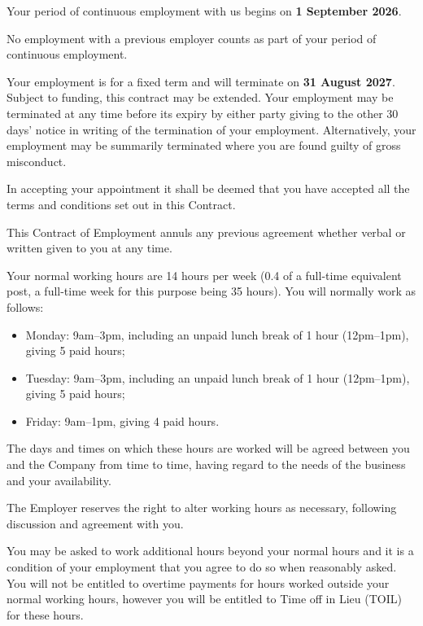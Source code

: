 \documentclass[a4paper,11pt,onecolumn ]{article}
\begin{document}
\begin{legal}
\item {}
\begin{legal}
  \item Your period of continuous employment with us begins on \textbf{1 September 2026}.
  \item No employment with a previous employer counts as part of your period of
  continuous employment.
  \item Your employment is for a fixed term and will terminate on \textbf{31 August 2027}.
  Subject to funding, this contract may be extended. Your employment may be
  terminated at any time before its expiry by either party giving to the other 30
  days’ notice in writing of the termination of your employment. Alternatively,
  your employment may be summarily terminated where you are found guilty of
  gross misconduct.
  \item In accepting your appointment it shall be deemed that you have accepted all the
  terms and conditions set out in this Contract.
  \item This Contract of Employment annuls any previous agreement whether verbal or
  written given to you at any time.
\end{legal}


\item {}
\begin{legal}
\item Your normal working hours are 14 hours per week (0.4 of a full-time equivalent post, a
full-time week for this purpose being 35 hours). You will normally work as follows:
\begin{itemize}
\item Monday: 9am--3pm, including an unpaid lunch break of 1 hour (12pm--1pm), giving 5 paid hours;
\item Tuesday: 9am--3pm, including an unpaid lunch break of 1 hour (12pm--1pm), giving 5 paid hours;
\item Friday: 9am--1pm, giving 4 paid hours.
\end{itemize}
The days and times on which these hours are worked will be agreed between you and the Company
from time to time, having regard to the needs of the business and your availability.


\item The Employer reserves the right to alter working hours as necessary, following
discussion and agreement with you.
\item You may be asked to work additional hours beyond your normal hours and it is
a condition of your employment that you agree to do so when reasonably asked.
You will not be entitled to overtime payments for hours worked outside your
normal working hours, however you will be entitled to Time off in Lieu (TOIL) for these 
hours.
\end{legal}



\end{legal}
\end{document}
